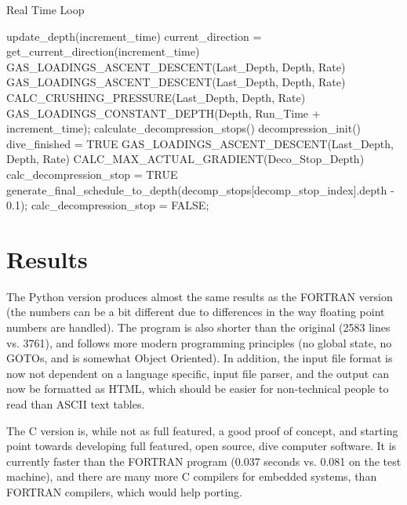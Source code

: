 \documentclass[12pt]{article}
\begin{document}
\begin{algorithm}[H]
\caption{Real Time Loop}
\label{real1}
\begin{algorithmic}
\STATE update\_depth(increment\_time)
\STATE current\_direction = get\_current\_direction(increment\_time)
\STATE GAS\_LOADINGS\_ASCENT\_DESCENT(Last\_Depth, Depth, Rate)
\STATE GAS\_LOADINGS\_ASCENT\_DESCENT(Last\_Depth, Depth, Rate)
\STATE CALC\_CRUSHING\_PRESSURE(Last\_Depth, Depth, Rate)
\ELSE
\STATE GAS\_LOADINGS\_CONSTANT\_DEPTH(Depth, Run\_Time + increment\_time);
\ENDIF
\ELSE
{}
\STATE calculate\_decompression\_stops()
\STATE decompression\_init()
\ELSE
  \STATE dive\_finished = TRUE
  \STATE GAS\_LOADINGS\_ASCENT\_DESCENT(Last\_Depth, Depth, Rate)
  \STATE CALC\_MAX\_ACTUAL\_GRADIENT(Deco\_Stop\_Depth)
  \STATE calc\_decompression\_stop = TRUE
  \ELSE
 \STATE generate\_final\_schedule\_to\_depth(decomp\_stops[decomp\_stop\_index].depth - 0.1);
 \STATE calc\_decompression\_stop = FALSE;
 \ENDIF
\ENDIF
\ENDIF
\ENDIF
\ENDWHILE
\end{algorithmic}
\end{algorithm}

\section{Results}

The Python version produces almost the same results as the FORTRAN version (the numbers can be a bit
different due to differences in the way floating point numbers are handled). The program is also
shorter than the original (2583 lines vs. 3761), and follows more modern programming principles
(no global state, no GOTOs, and is somewhat Object Oriented). In addition, the input file format
is now not dependent on a language specific, input file parser, and the output can now be
formatted as HTML, which should be easier for non-technical people to read than ASCII text tables.

The C version is, while not as full featured, a good proof of concept, and starting point towards
developing full featured, open source, dive computer software. It is currently faster than the
FORTRAN program (0.037 seconds vs. 0.081 on the test machine), and there are many more C compilers for
embedded systems, than FORTRAN compilers, which would help porting.
\end{document}
